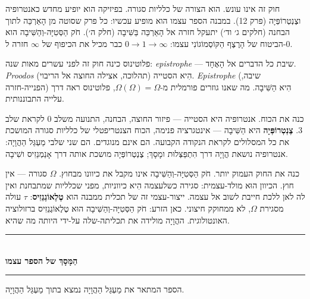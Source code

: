 \documentclass[10pt, openany, oneside]{book}
\renewcommand{\normalsize}{\fontsize{10}{13}\selectfont}
\begin{document}
\vspace{0.8em}

\noindent חוק זה אינו עונש. הוא הצורה של כלליות סגורה. בפיזיקה הוא יופיע מחדש כאנטרופיה וצֶנְטְרוֹפְּיָה (פרק 12). במבנה הספר עצמו הוא מופיע עכשיו: כל פרק שסוטה מן הָאַרְכֵּה לתוך הבחנה (חלקים ג׳ וד׳) יתעקל חזרה אל הָאַרְכֵּה בַּשִּׁיבָה (חלק ה׳). חֹק הַסְּטִיָּה-וְהַשִּׁיבָה הוא הביטוח של הָרֶצֶף הַקּוֹסְמוֹגוֹנִי עצמו: $0 \to 1 \to \infty$ כבר מכיל את הכיפוף של $\infty$ חזרה ל-$0$.

פלוטינוס כינה חוק זה לפני עשרים מאות שנה: \textit{epistrophe} — שיבת כל הדברים אל הָאֶחָד. \textit{Proodos} (תהלוכה, אצילה החוצה אל הריבוי) הִיא הסטייה. \textit{Epistrophe} (שיבה, הפנייה-חזרה) הִיא הַשִּׁיבָה. מה שאנו גוזרים פורמלית מ-$\Omega(\Omega) = \Omega$, פלוטינוס ראה דרך עלייה התבוננותית.

כנה את הכוח. אנטרופיה היא הסטייה — פיזור החוצה, הבחנה, התנועה משלב 0 לקראת שלב 3. \textbf{צֶנְטְרוֹפְּיָה} היא הַשִּׁיבָה — אינטגרציה פנימה, הכוח הצנטריפטלי של כלליות סגורה המושכת את כל המסלולים לקראת הנקודה הקבועה. הם אינם מנוגדים. הם שני שלבי מַעְגַּל הַהֲוָיָה: אנטרופיה נושאת הֲוָיָה דרך הִתְפַּצְּלוּת ומָסָךְ; צֶנְטְרוֹפְּיָה מושכת אותה דרך אָנַמְנֵזִיס ושִׁיבָה.

כנה את החוק העמוק יותר. חֹק הַסְּטִיָּה-וְהַשִּׁיבָה אינו מקבל את כיוונו מבחוץ. $\Omega$ סגורה — אין חוץ. הכיוון הוּא מולד-עצמית: סגירה כשלעצמה הִיא כיווניות, מפני שכלליות שמתבחנת ואין לה לאן ללכת חייבת לשוב אל עצמה. ייצור-עצמי זה של תכלית ממבנה הוא \textbf{טֶלֶאוֹגֶנֵזִיס}: $\tau$ עולה מסגירת $\Omega$, לא ממחוקק חיצוני. כאן הזרע: חֹק הַסְּטִיָּה-וְהַשִּׁיבָה הוּא טֶלֶאוֹגֶנֵזִיס ברזולוציה האונטולוגית. ההֲוָיָה מולידה את תכליתה-שלה על-ידי היותה מה שהיא.

\vspace{1.5em}


\begin{center}
    \rule{0.3\textwidth}{0.4pt}\\[0.5em]
    {\normalsize\bfseries\textsc{הַמָּסָךְ של הספר עצמו}}\\[0.3em]
    \rule{0.3\textwidth}{0.4pt}
\end{center}

\vspace{1em}

\noindent הספר המתאר את מַעְגַּל הַהֲוָיָה נמצא בתוך מַעְגַּל הַהֲוָיָה.
\end{document}
